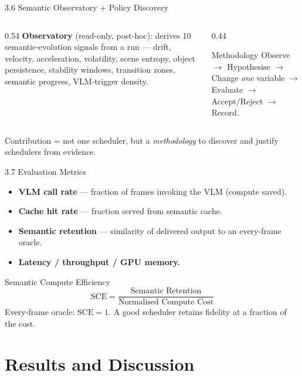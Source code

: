\documentclass[11pt,aspectratio=169]{beamer}
\begin{document}
\begin{frame}{3.6 Semantic Observatory + Policy Discovery}
\begin{columns}[T]
\begin{column}{0.54\textwidth}
\textbf{Observatory} (read-only, post-hoc): derives 10 semantic-evolution signals from a run ---
\footnotesize drift, velocity, acceleration, volatility, scene entropy, object persistence, stability windows, transition zones, semantic progress, VLM-trigger density.
\end{column}
\begin{column}{0.44\textwidth}
\begin{block}{Methodology}
Observe $\rightarrow$ Hypothesise $\rightarrow$ Change \emph{one} variable $\rightarrow$ Evaluate $\rightarrow$ Accept/Reject $\rightarrow$ Record.
\end{block}
\end{column}
\end{columns}
\vspace{1mm}
\centering\footnotesize Contribution = not one scheduler, but a \emph{methodology} to discover and justify schedulers from evidence.
\end{frame}

\begin{frame}{3.7 Evaluation Metrics}
\begin{itemize}
  \item \textbf{VLM call rate} --- fraction of frames invoking the VLM (compute saved).
  \item \textbf{Cache hit rate} --- fraction served from semantic cache.
  \item \textbf{Semantic retention} --- similarity of delivered output to an every-frame oracle.
  \item \textbf{Latency / throughput / GPU memory.}
\end{itemize}
\begin{block}{Semantic Compute Efficiency}
\[
\mathrm{SCE} = \frac{\text{Semantic Retention}}{\text{Normalised Compute Cost}}
\]
Every-frame oracle: $\mathrm{SCE}=1$. A good scheduler retains fidelity at a fraction of the cost.
\end{block}
\end{frame}

\section{Results and Discussion}
\end{document}
